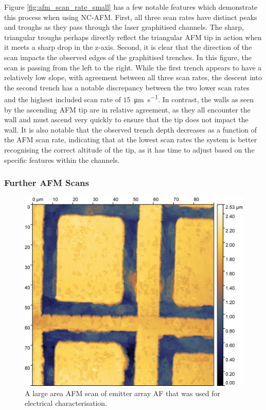 \begin{refsection}
Figure \ref{fig:afm_scan_rate_small} has a few notable features which demonstrate this process when using NC-AFM. First, all three scan rates have distinct peaks and troughs as they pass through the laser graphitised channels. The sharp, triangular troughs perhaps directly reflect the triangular AFM tip in action when it meets a sharp drop in the z-axis. Second, it is clear that the direction of the scan impacts the observed edges of the graphitised trenches. In this figure, the scan is passing from the left to the right. While the first trench appears to have a relatively low slope, with agreement between all three scan rates, the descent into the second trench has a notable discrepancy between the two lower scan rates and the highest included scan rate of $15$~\si{\micro\metre\per\second}. In contrast, the walls as seen by the ascending AFM tip are in relative agreement, as they all encounter the wall and must ascend very quickly to ensure that the tip does not impact the wall. It is also notable that the observed trench depth decreases as a function of the AFM scan rate, indicating that at the lowest scan rates the system is better recognising the correct altitude of the tip, as it has time to adjust based on the specific features within the channels.

\subsubsection{Further AFM Scans}
\label{subsubsec:further_afm_scans}

\begin{figure}[H]
    \centering
    \includegraphics[width=\textwidth]{Chapter7/Figs/Raster/AF emitter array afm.jpg}
    \caption{A large area AFM scan of emitter array AF that was used for electrical characterisation.}
    \label{fig:afm_af_large}
\end{figure}


\end{refsection}
